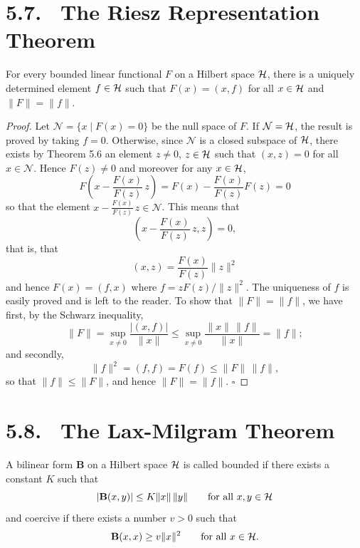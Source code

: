 \section*{5.7. \ The Riesz Representation Theorem}

\begin{theorem}\label{gt.thm5.7}
For every bounded linear functional $F$ on a Hilbert space $\Hspace$, there is a uniquely determined element $f\in \Hspace$ such that $F(x)=(x,f)$ for all $x\in \Hspace$ and $\|F\|=\|f\|$.
\end{theorem}

\begin{proof}
Let $\mathcal N=\{x\mid F(x)=0\}$ be the null space of $F$. If $\mathcal N=\Hspace$, the result is proved by taking $f=0$. Otherwise, since $\mathcal N$ is a closed subspace of $\Hspace$, there exists by Theorem 5.6 an element $z\neq 0$, $z\in \Hspace$ such that $(x,z)=0$ for all $x\in \mathcal N$. Hence $F(z)\neq 0$ and moreover for any $x\in \Hspace$,
\[
F\!\left(x-\frac{F(x)}{F(z)}\,z\right)=F(x)-\frac{F(x)}{F(z)}F(z)=0
\]
so that the element $x-\frac{F(x)}{F(z)}\,z\in \mathcal N$. This means that
\[
\left(x-\frac{F(x)}{F(z)}\,z,z\right)=0,
\]
that is, that
\[
(x,z)=\frac{F(x)}{F(z)}\|z\|^2
\]
and hence $F(x)=(f,x)$ where $f=zF(z)/\|z\|^2$. The uniqueness of $f$ is easily proved and is left to the reader. To show that $\|F\|=\|f\|$, we have first, by the Schwarz inequality,
\[
\|F\|=\sup_{x\neq 0}\frac{|(x,f)|}{\|x\|}\leq \sup_{x\neq 0}\frac{\|x\|\,\|f\|}{\|x\|}=\|f\|;
\]
and secondly,
\[
\|f\|^2=(f,f)=F(f)\leq \|F\|\,\|f\|,
\]
so that $\|f\|\leq \|F\|$, and hence $\|F\|=\|f\|$. $\square$
\end{proof}

\section*{5.8. \ The Lax-Milgram Theorem}

\begin{definition}\label{gt.def5.8.bilinear}
A bilinear form $\mathbf{B}$ on a Hilbert space $\Hilb$ is called bounded if there exists a constant $K$ such that
\begin{equation}\label{gt.eq5.10}\dcref{(5.10)}\group{chapter-5}\source{gilbarg-trudinger:page-0095}
|\mathbf{B}(x,y)|\le K\|x\|\,\|y\| \qquad \text{for all $x,y\in \Hilb$}
\end{equation}
and coercive if there exists a number $v>0$ such that
\begin{equation}\label{gt.eq5.11}\dcref{(5.11)}\group{chapter-5}\source{gilbarg-trudinger:page-0095}
\mathbf{B}(x,x)\ge v\|x\|^2 \qquad \text{for all $x\in \Hilb$.}
\end{equation}
\end{definition}

